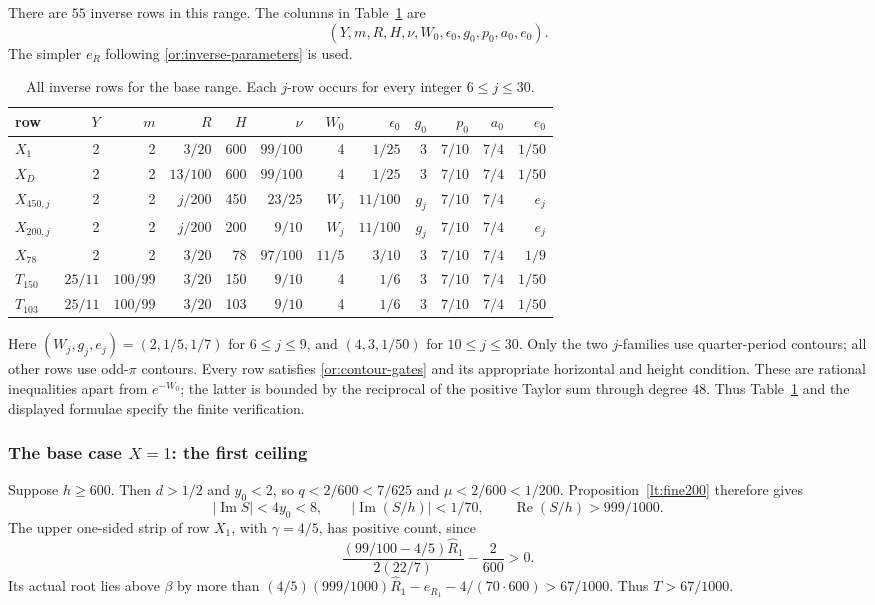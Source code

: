 \documentclass[11pt,reqno]{amsart}
\numberwithin{equation}{section}
\theoremstyle{definition}
\theoremstyle{remark}
\renewcommand{\Re}{\operatorname{Re}}
\renewcommand{\Im}{\operatorname{Im}}
\begin{document}
There are $55$ inverse rows in this range.  The columns in
Table~\ref{or:base-contours} are
\[
 (Y,m,R,H,\nu,W_0,\epsilon_0,g_0,p_0,a_0,e_0).
\]
The simpler $e_R$ following \eqref{or:inverse-parameters} is used.
\begin{table}[ht]
\centering\scriptsize
\caption{All inverse rows for the base range.  Each $j$-row occurs for
every integer $6\le j\le30$.}\label{or:base-contours}
\begin{tabular}{@{}lrrrrrrrrrrr@{}}
\toprule
row&$Y$&$m$&$R$&$H$&$\nu$&$W_0$&$\epsilon_0$&$g_0$&$p_0$&$a_0$&$e_0$\\
\midrule
$X_1$&2&2&$3/20$&600&$99/100$&4&$1/25$&3&$7/10$&$7/4$&$1/50$\\
$X_D$&2&2&$13/100$&600&$99/100$&4&$1/25$&3&$7/10$&$7/4$&$1/50$\\
$X_{450,j}$&2&2&$j/200$&450&$23/25$&$W_j$&$11/100$&$g_j$&$7/10$&$7/4$&$e_j$\\
$X_{200,j}$&2&2&$j/200$&200&$9/10$&$W_j$&$11/100$&$g_j$&$7/10$&$7/4$&$e_j$\\
$X_{78}$&2&2&$3/20$&78&$97/100$&$11/5$&$3/10$&3&$7/10$&$7/4$&$1/9$\\
$T_{150}$&$25/11$&$100/99$&$3/20$&150&$9/10$&4&$1/6$&3&$7/10$&$7/4$&$1/50$\\
$T_{103}$&$25/11$&$100/99$&$3/20$&103&$9/10$&4&$1/6$&3&$7/10$&$7/4$&$1/50$\\
\bottomrule
\end{tabular}
\end{table}
Here $(W_j,g_j,e_j)=(2,1/5,1/7)$ for $6\le j\le9$, and
$(4,3,1/50)$ for $10\le j\le30$.  Only the two $j$-families use
quarter-period contours; all other rows use odd-$\pi$ contours.
Every row satisfies \eqref{or:contour-gates} and its appropriate
horizontal and height condition.  These are rational inequalities
apart from $e^{-W_0}$; the latter is bounded by the reciprocal of the
positive Taylor sum through degree $48$.  Thus Table~\ref{or:base-contours}
and the displayed formulae specify the finite verification.

\subsubsection{The base case $X=1$: the first ceiling}

Suppose $h\ge600$.  Then $d>1/2$ and $y_0<2$, so
$q<2/600<7/625$ and $\mu<2/600<1/200$.
Proposition~\ref{lt:fine200} therefore gives
\begin{equation}\label{or:base-high-phase}
 |\Im S|<4y_0<8,\qquad
 |\Im(S/h)|<1/70,\qquad \Re(S/h)>999/1000.
\end{equation}
The upper one-sided strip of row $X_1$, with $\gamma=4/5$, has
positive count, since
\[
 \frac{(99/100-4/5)\widehat R_1}{2(22/7)}-\frac2{600}>0.
\]
Its actual root lies above $\beta$ by more than
$(4/5)(999/1000)\widehat R_1-e_{R_1}-4/(70\cdot600)>67/1000$.
Thus $T>67/1000$.
\end{document}
